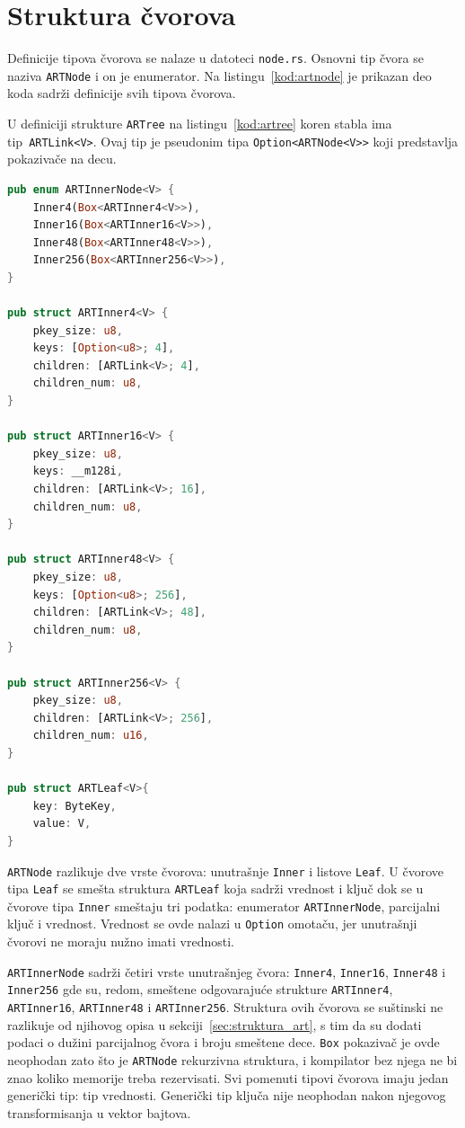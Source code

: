 \documentclass[12pt,oneside]{memoir}
\begin{document}
\section{Struktura čvorova}
Definicije tipova čvorova se nalaze u datoteci \texttt{node.rs}.
Osnovni tip čvora se naziva \texttt{ARTNode} i on je enumerator.
Na listingu~\ref{kod:artnode} je prikazan deo koda sadrži definicije
svih tipova čvorova.

U definiciji strukture \texttt{ARTree} na listingu~\ref{kod:artree}
koren stabla ima tip~\texttt{ARTLink<V>}. Ovaj tip je
pseudonim tipa \texttt{Option<ARTNode<V>>} koji predstavlja
pokazivače na decu.


\begin{lstlisting}[language=Rust,
                   caption={Definicije čvorova
                            koji se nalaze u strukturi \texttt{ARTree}},
                   label={kod:artnode}]
pub enum ARTInnerNode<V> {
    Inner4(Box<ARTInner4<V>>),
    Inner16(Box<ARTInner16<V>>),
    Inner48(Box<ARTInner48<V>>),
    Inner256(Box<ARTInner256<V>>),
}

pub struct ARTInner4<V> {
    pkey_size: u8,
    keys: [Option<u8>; 4],
    children: [ARTLink<V>; 4],
    children_num: u8,
}

pub struct ARTInner16<V> {
    pkey_size: u8,
    keys: __m128i,
    children: [ARTLink<V>; 16],
    children_num: u8,
}

pub struct ARTInner48<V> {
    pkey_size: u8,
    keys: [Option<u8>; 256],
    children: [ARTLink<V>; 48],
    children_num: u8,
}

pub struct ARTInner256<V> {
    pkey_size: u8,
    children: [ARTLink<V>; 256],
    children_num: u16,
}

pub struct ARTLeaf<V>{
    key: ByteKey,
    value: V,
}
\end{lstlisting}

\texttt{ARTNode} razlikuje dve vrste čvorova: unutrašnje \texttt{Inner} i
listove \texttt{Leaf}. U čvorove tipa \texttt{Leaf} se smešta struktura \texttt{ARTLeaf}
koja sadrži vrednost i ključ dok se u čvorove tipa \texttt{Inner} smeštaju tri podatka:
enumerator \texttt{ARTInnerNode}, parcijalni ključ i vrednost. Vrednost se ovde
nalazi u \texttt{Option} omotaču, jer unutrašnji čvorovi
ne moraju nužno imati vrednosti.

\texttt{ARTInnerNode} sadrži četiri vrste unutrašnjeg čvora:
\texttt{Inner4}, \texttt{Inner16}, \texttt{Inner48} i
\texttt{Inner256} gde su, redom, smeštene odgovarajuće strukture
\texttt{ARTInner4}, \texttt{ARTInner16}, \texttt{ARTInner48} i
\texttt{ARTInner256}. Struktura ovih čvorova se suštinski ne razlikuje od
njihovog opisa u sekciji~\ref{sec:struktura_art}, s tim da su dodati
podaci o dužini parcijalnog čvora i broju smeštene dece.
\texttt{Box} pokazivač je ovde neophodan zato što je \texttt{ARTNode}
rekurzivna struktura, i kompilator bez njega ne bi znao
koliko memorije treba rezervisati.
Svi pomenuti tipovi čvorova imaju jedan generički
tip: tip vrednosti. Generički tip ključa nije neophodan nakon njegovog
transformisanja u vektor bajtova.
\end{document}
